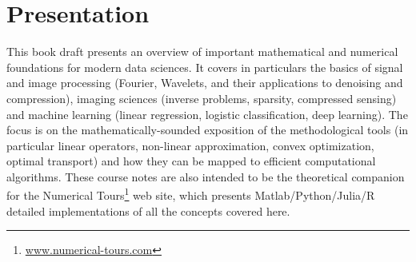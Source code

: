 
\chapter*{Presentation}

	This book draft presents an overview of important mathematical and numerical foundations for modern data sciences. 
	It covers in particulars the basics of signal and image processing (Fourier, Wavelets, and their applications to denoising and compression), imaging sciences (inverse problems, sparsity, compressed sensing) and machine learning (linear regression, logistic classification, deep learning). 
	The focus is on the mathematically-sounded exposition of the methodological tools (in particular linear operators, non-linear approximation, convex optimization, optimal transport) and how they can be mapped to efficient computational algorithms. 
	These course notes are also intended to be the theoretical companion for the Numerical Tours\footnote{\url{www.numerical-tours.com}} web site, which presents Matlab/Python/Julia/R detailed implementations of all the concepts covered here.
		





\tableofcontents
